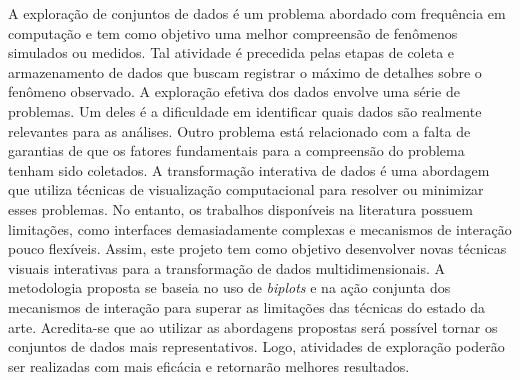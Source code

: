 \begin{resumo}
%
A exploração de conjuntos de dados é um problema abordado
com frequência em computação e tem como objetivo uma melhor
compreensão de fenômenos simulados ou medidos.
%
Tal atividade é precedida pelas etapas de coleta e
armazenamento de dados que buscam registrar o máximo
de detalhes sobre o fenômeno observado.
%
A exploração efetiva dos dados envolve uma série de
problemas. 
%
Um deles é a dificuldade em identificar quais
dados são realmente relevantes para as
análises. 
%
Outro problema está relacionado com a falta de
garantias de que os fatores fundamentais para a compreensão
do problema tenham sido coletados.
% 
A transformação interativa de dados é uma abordagem que
utiliza técnicas de visualização computacional para 
resolver ou minimizar esses problemas. 
%
No entanto, os trabalhos disponíveis na literatura
possuem limitações, como interfaces demasiadamente
complexas e mecanismos de interação pouco flexíveis. 
%
Assim, este projeto tem como objetivo desenvolver novas
técnicas visuais interativas para a transformação de dados
multidimensionais.
%
A metodologia proposta se baseia no uso de \emph{biplots} e na
ação conjunta dos mecanismos de interação para superar as
limitações das técnicas do estado da arte.
%
Acredita-se que ao utilizar as abordagens propostas 
será possível tornar os conjuntos de dados mais
representativos. 
%
Logo, atividades de exploração poderão ser
realizadas com mais eficácia e retornarão melhores
resultados.
\end{resumo}
